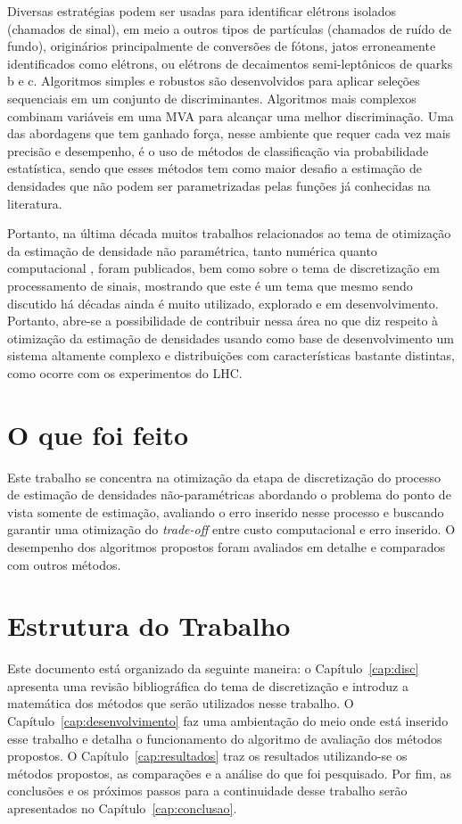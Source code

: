 Diversas estratégias podem ser usadas para identificar elétrons isolados (chamados de sinal), em meio a outros tipos de partículas (chamados de ruído de fundo), originários principalmente de conversões de fótons, jatos erroneamente identificados como elétrons, ou elétrons de decaimentos semi-leptônicos de quarks b e c. Algoritmos simples e robustos são desenvolvidos para aplicar seleções sequenciais em um conjunto de discriminantes. Algoritmos mais complexos combinam variáveis em uma \ac{MVA} para alcançar uma melhor discriminação. Uma das abordagens que tem ganhado força, nesse ambiente que requer cada vez mais precisão e desempenho, é o uso de métodos de classificação via probabilidade estatística, sendo que esses métodos tem como maior desafio a estimação de densidades que não podem ser parametrizadas pelas funções já conhecidas na literatura.

Portanto, na última década muitos trabalhos relacionados ao tema de otimização da estimação de densidade não paramétrica, tanto numérica \cite{schindler2012bandwidth} quanto computacional \cite{gramacki2017nonparametric}, foram publicados, bem como sobre o tema de discretização em processamento de sinais, mostrando que este é um tema que mesmo sendo discutido há décadas ainda é muito utilizado, explorado e em desenvolvimento. Portanto, abre-se a possibilidade de contribuir nessa área no que diz respeito à otimização da estimação de densidades usando como base de desenvolvimento um sistema altamente complexo e distribuições com características bastante distintas, como ocorre com os experimentos do \ac{LHC}. 

\section{O que foi feito}

Este trabalho se concentra na otimização da etapa de discretização do processo de estimação de densidades não-paramétricas abordando o problema do ponto de vista somente de estimação, avaliando o erro inserido nesse processo e buscando garantir uma otimização do \textit{trade-off} entre custo computacional e erro inserido. O desempenho dos algoritmos propostos foram avaliados em detalhe e comparados com outros métodos.

\section{Estrutura do Trabalho}

Este documento está organizado da seguinte maneira: o Capítulo~\ref{cap:disc} apresenta uma revisão bibliográfica do tema de discretização e introduz a matemática dos métodos que serão utilizados nesse trabalho. O Capítulo~\ref{cap:desenvolvimento} faz uma ambientação do meio onde está inserido esse trabalho e detalha o funcionamento do algoritmo de avaliação dos métodos propostos. O Capítulo~\ref{cap:resultados} traz os resultados utilizando-se os métodos propostos, as comparações e a análise do que foi pesquisado. Por fim, as conclusões e os próximos passos para a continuidade desse trabalho serão apresentados no Capítulo~\ref{cap:conclusao}.

